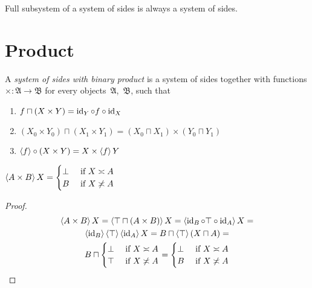 \begin{obvious}
Full subsystem of a system of sides is always a system of sides.
\end{obvious}


\section{Product}

\begin{defn}
A \emph{system of sides with binary product} is a system of sides together with functions $\mathord{\times}:\mathfrak{A}\rightarrow\mathfrak{B}$
for every objects~$\mathfrak{A}$,~$\mathfrak{B}$, such that
\begin{enumerate}
\item \label{f-c-x-y}$f\sqcap(X\times Y) = \operatorname{id}_Y\circ f\circ\operatorname{id}_X$
\item \label{f-xy-x0y0}$(X_0\times Y_0)\sqcap(X_1\times Y_1) = (X_0\sqcap X_1)\times(Y_0\sqcap Y_1)$
\item $\left\langle f\right\rangle\circ(X\times Y) = X\times\left\langle f\right\rangle Y$
\end{enumerate}
\end{defn}

\begin{prop}
$\left\langle A\times B\right\rangle X = \begin{cases}\bot&\text{ if }X\asymp A\\B&\text{ if }X\not\asymp A\end{cases}$
\end{prop}

\begin{proof}
~
\begin{multline*}
\left\langle A\times B\right\rangle X = \left\langle \top\sqcap(A\times B)\right\rangle X = \left\langle \operatorname{id}_B\circ\top\circ\operatorname{id}_A\right\rangle X = \\
\left\langle \operatorname{id}_B\right\rangle\left\langle \top\right\rangle\left\langle \operatorname{id}_A\right\rangle X =
B\sqcap\left\langle \top\right\rangle(X\sqcap A) = \\
B\sqcap\begin{cases}\bot&\text{ if }X\asymp A\\\top&\text{ if }X\not\asymp A\end{cases} =
\begin{cases}\bot&\text{ if }X\asymp A\\B&\text{ if }X\not\asymp A\end{cases}
\end{multline*}
\end{proof}

